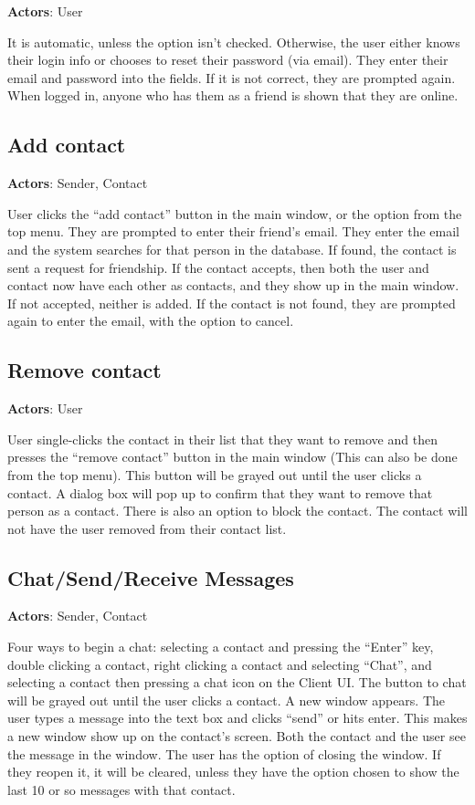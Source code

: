 {\bf Actors}: User

It is automatic, unless the option isn’t checked. Otherwise, the user either knows their login info or chooses to reset their password (via email). They enter their email and password into the fields. If it is not correct, they are prompted again. When logged in, anyone who has them as a friend is shown that they are online.

\subsection*{Add contact}

{\bf Actors}: Sender, Contact

User clicks the ``add contact'' button in the main window, or the option from the top menu. They are prompted to enter their friend’s email. They enter the email and the system searches for that person in the database. If found, the contact is sent a request for friendship. If the contact accepts, then both the user and contact now have each other as contacts, and they show up in the main window. If not accepted, neither is added. If the contact is not found, they are prompted again to enter the email, with the option to cancel.

\subsection*{Remove contact}

{\bf Actors}: User

User single-clicks the contact in their list that they want to remove and then presses the “remove contact” button in the main window (This can also be done from the top menu). This button will be grayed out until the user clicks a contact. A dialog box will pop up to confirm that they want to remove that person as a contact. There is also an option to block the contact. The contact will not have the user removed from their contact list.

\subsection*{Chat/Send/Receive Messages}

{\bf Actors}: Sender, Contact

Four ways to begin a chat: selecting a contact and pressing the ``Enter'' key, double clicking a contact, right clicking a contact and selecting ``Chat'', and selecting a contact then pressing a chat icon on the Client UI. The button to chat will be grayed out until the user clicks a contact.
A new window appears. The user types a message into the text box and clicks ``send'' or hits enter. This makes a new window show up on the contact's screen. Both the contact and the user see the message in the window. The user has the option of closing the window. If they reopen it, it will be cleared, unless they have the option chosen to show the last 10 or so messages with that contact.

